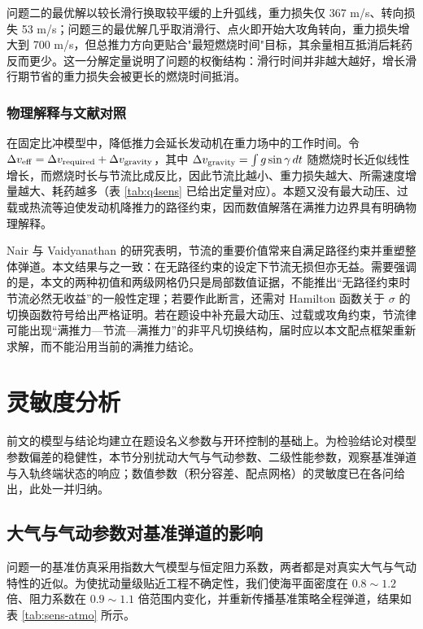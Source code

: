\documentclass[withoutpreface,bwprint]{cumcmthesis}
\begin{document}
问题二的最优解以较长滑行换取较平缓的上升弧线，重力损失仅 367 m/s、转向损失 53 m/s；问题三的最优解几乎取消滑行、点火即开始大攻角转向，重力损失增大到 700 m/s，但总推力方向更贴合"最短燃烧时间"目标，其余量相互抵消后耗药反而更少。这一分解定量说明了问题的权衡结构：滑行时间并非越大越好，增长滑行期节省的重力损失会被更长的燃烧时间抵消。

\subsubsection{物理解释与文献对照}
在固定比冲模型中，降低推力会延长发动机在重力场中的工作时间。令 $\Delta v_{\rm eff}=\Delta v_{\rm required}+\Delta v_{\rm gravity}$，其中 $\Delta v_{\rm gravity}=\int g\sin\gamma\,dt$ 随燃烧时长近似线性增长，而燃烧时长与节流比成反比，因此节流比越小、重力损失越大、所需速度增量越大、耗药越多（表 \ref{tab:q4sens} 已给出定量对应）。本题又没有最大动压、过载或热流等迫使发动机降推力的路径约束，因而数值解落在满推力边界具有明确物理解释。

Nair 与 Vaidyanathan 的研究表明，节流的重要价值常来自满足路径约束并重塑整体弹道\cite{nair2022}。本文结果与之一致：在无路径约束的设定下节流无损但亦无益。需要强调的是，本文的两种初值和两级网格仍只是局部数值证据，不能推出“无路径约束时节流必然无收益”的一般性定理；若要作此断言，还需对 Hamilton 函数关于 $\sigma$ 的切换函数符号给出严格证明。若在题设中补充最大动压、过载或攻角约束，节流律可能出现“满推力—节流—满推力”的非平凡切换结构，届时应以本文配点框架重新求解，而不能沿用当前的满推力结论。

\section{灵敏度分析}

前文的模型与结论均建立在题设名义参数与开环控制的基础上。为检验结论对模型参数偏差的稳健性，本节分别扰动大气与气动参数、二级性能参数，观察基准弹道与入轨终端状态的响应；数值参数（积分容差、配点网格）的灵敏度已在各问给出，此处一并归纳。

\subsection{大气与气动参数对基准弹道的影响}
问题一的基准仿真采用指数大气模型与恒定阻力系数，两者都是对真实大气与气动特性的近似。为使扰动量级贴近工程不确定性，我们使海平面密度在 $0.8\sim1.2$ 倍、阻力系数在 $0.9\sim1.1$ 倍范围内变化，并重新传播基准策略全程弹道，结果如表 \ref{tab:sens-atmo} 所示。
\end{document}
